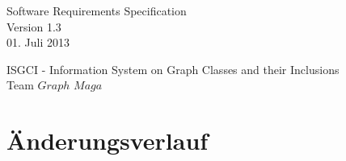 \documentclass[10pt,a4paper]{article}
\begin{document}
\thispagestyle{empty} %
\vspace*{5cm} 
\begin{center}
{\huge Software Requirements Specification}\\
{\large Version 1.3}\\
{\large 01. Juli 2013}\\
\end{center}

\begin{center}
{\large ISGCI - Information System on Graph Classes and their Inclusions}\\
{\large Team $Graph$ $Maga$}
\end{center}




 
 
 
 \newpage
 
 \renewcommand{\contentsname}{Inhaltsverzeichnis}
 \tableofcontents %

\vfill 
 \section{Änderungsverlauf}
\end{document}
